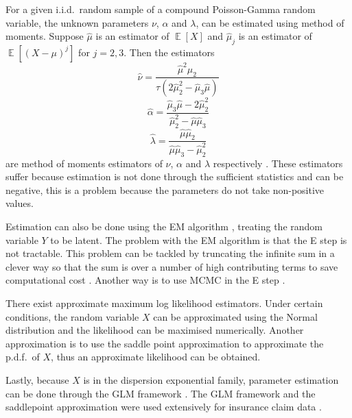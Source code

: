 \documentclass[a4paper]{proc}
\DeclareMathOperator{\expectation}{\mathbb{E}}
\begin{document}
For a given i.i.d.~random sample of a compound Poisson-Gamma random variable, the unknown parameters $\nu$, $\alpha$ and $\lambda$, can be estimated using method of moments. Suppose $\widehat{\mu}$ is an estimator of $\expectation[X]$ and $\widehat{\mu}_j$ is an estimator of $\expectation\left[\left(X-\mu\right)^j\right]$ for $j=2,3$. Then the estimators
\begin{equation}
\widehat{\nu}=\frac{\widehat{\mu}^2\widehat{\mu}_2}{\tau\left(2\widehat{\mu}_2^2-\widehat{\mu}_3\widehat{\mu}\right)}
\end{equation}
\begin{equation}
\widehat{\alpha}=\frac{\widehat{\mu}_3\widehat{\mu}-2\widehat{\mu}_2^2}{\widehat{\mu}_2^2-\widehat{\mu}\widehat{\mu}_3}
\end{equation}
\begin{equation}
\widehat{\lambda}=\frac{\widehat{\mu}\widehat{\mu}_2}{\widehat{\mu}\widehat{\mu}_3-\widehat{\mu}_2^2}
\end{equation}
are method of moments estimators of $\nu$, $\alpha$ and $\lambda$ respectively \cite{withers2011compound}. These estimators suffer because estimation is not done through the sufficient statistics and can be negative, this is a problem because the parameters do not take non-positive values.

Estimation can also be done using the EM algorithm \cite{dempster1977maximum}, treating the random variable $Y$ to be latent. The problem with the EM algorithm is that the E step is not tractable. This problem can be tackled by truncating the infinite sum in a clever way so that the sum is over a number of high contributing terms to save computational cost \cite{dunn2005series}. Another way is to use MCMC in the E step \cite{booth1999maximizing}.

There exist approximate maximum log likelihood estimators. Under certain conditions, the random variable $X$ can be approximated using the Normal distribution and the likelihood can be maximised numerically. Another approximation is to use the saddle point approximation \cite{daniels1954saddlepoint} to approximate the p.d.f.~of $X$, thus an approximate likelihood can be obtained.

Lastly, because $X$ is in the dispersion exponential family, parameter estimation can be done through the GLM framework \cite{zhang2013likelihood}. The GLM framework and the saddlepoint approximation were used extensively for insurance claim data \cite{jorgensen1994fitting} \cite{jensen1991saddlepoint}.
\end{document}
